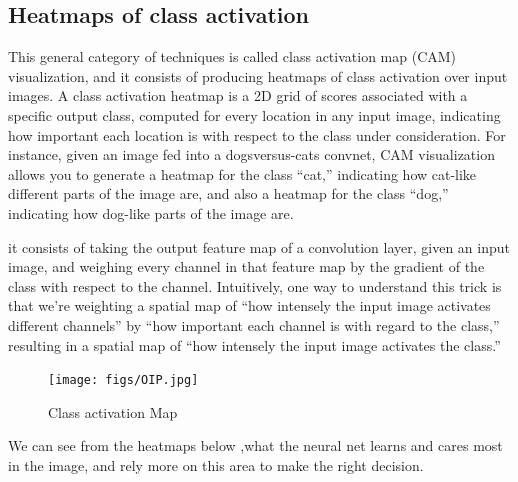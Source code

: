 \subsection{Heatmaps of class activation}

This general category of techniques is called class activation map (CAM) visualization,
and it consists of producing heatmaps of class activation over input images. A class activation heatmap is a 2D grid of scores associated with a specific output class, computed
for every location in any input image, indicating how important each location is with respect to the class under consideration. For instance, given an image fed into a dogsversus-cats convnet, CAM visualization allows you to generate a heatmap for the class
“cat,” indicating how cat-like different parts of the image are, and also a heatmap for the
class “dog,” indicating how dog-like parts of the image are.
 
it consists of taking the output feature map of a convolution layer, given an input
image, and weighing every channel in that feature map by the gradient of the class
with respect to the channel. Intuitively, one way to understand this trick is that we’re
weighting a spatial map of “how intensely the input image activates different channels” by “how important each channel is with regard to the class,” resulting in a spatial
map of “how intensely the input image activates the class.”

\begin{figure}[H]
  \centering
  \texttt{[image: figs/OIP.jpg]}
  \caption{Class activation Map}
  \label{fig:example}
\end{figure}

We can see from the heatmaps below ,what the neural net learns and cares most in the image, and rely more on this area to make the right decision.

